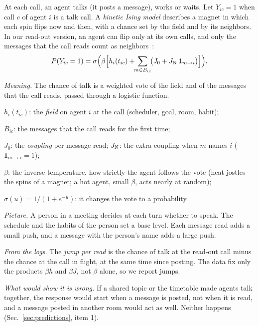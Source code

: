 At each call, an agent talks (it posts a message), works or waits. Let $Y_{ic}=1$ when call $c$ of agent $i$ is a talk call. A \emph{kinetic Ising model} describes a magnet in which each spin flips now and then, with a chance set by the field and by its neighbors. In our read-out version, an agent can flip only at its own calls, and only the messages that the call reads count as neighbors~\cite{glauber1963,aguilera2026}:
\begin{equation}
P(Y_{ic}=1)=\sigma\Big(\beta\Big[h_i(t_{ic})+\!\!\sum_{m\in B_{ic}}\!\!\big(J_0+J_{\rm N}\,\mathbf 1_{m\to i}\big)\Big]\Big).
\label{eq:pic-kinetic}
\end{equation}

\emph{Meaning.} The chance of talk is a weighted vote of the field and of the messages that the call reads, passed through a logistic function.
\begin{tightitem}
\item $h_i(t_{ic})$: the \emph{field} on agent $i$ at the call (scheduler, goal, room, habit);
\item $B_{ic}$: the messages that the call reads for the first time;
\item $J_0$: the \emph{coupling} per message read; $J_{\rm N}$: the extra coupling when $m$ names $i$ ($\mathbf 1_{m\to i}=1$);
\item $\beta$: the inverse temperature, how strictly the agent follows the vote (heat jostles the spins of a magnet; a hot agent, small $\beta$, acts nearly at random);
\item $\sigma(u)=1/(1+e^{-u})$: it changes the vote to a probability.
\end{tightitem}
\emph{Picture.} A person in a meeting decides at each turn whether to speak. The schedule and the habits of the person set a base level. Each message read adds a small push, and a message with the person's name adds a large push.

\emph{From the logs.} The \emph{jump per read} is the chance of talk at the read-out call minus the chance at the call in flight, at the same time since posting. The data fix only the products $\beta h$ and $\beta J$, not $\beta$ alone, so we report jumps.

\emph{What would show it is wrong.} If a shared topic or the timetable made agents talk together, the response would start when a message is posted, not when it is read, and a message posted in another room would act as well. Neither happens (Sec.~\ref{sec:predictions}, item 1).

